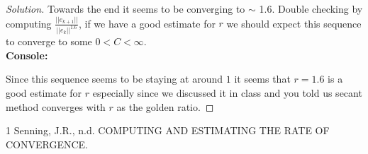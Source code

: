 \documentclass[12pt]{article}
\makeatletter
\theoremstyle{homework}
\newenvironment{exercise}[1]
{\def\@currentlabel{#1}\exercisecore}
{\endexercisecore}
\makeatother
\begin{document}
\begin{exercise}{P17}
\begin{enumerate}
\begin{proof}[Solution]
Towards the end it seems to be converging to $\sim$ 1.6. Double checking by computing $\frac{||e_{k + 1}||}{||e_k||^{1.6}}$, if 
we have a good estimate for $r$ we should expect this sequence to converge to some $0< C < \infty$.\\

\textbf{Console:}
\begin{center}
  
\end{center}
Since this sequence seems to be staying at around $1$ it seems that $r = 1.6$ is a good estimate for $r$ especially since we 
discussed it in class and you told us secant method converges with $r$ as the golden ratio. 

\end{proof}
  \end{enumerate}
  
\end{exercise}
\begin{thebibliography}{1}  %
  Senning, J.R., n.d. COMPUTING AND ESTIMATING THE RATE OF CONVERGENCE.
  \end{thebibliography}
\end{document}
